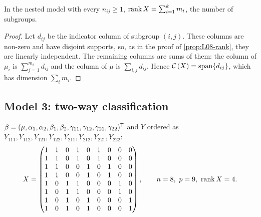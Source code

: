 \begin{proposition}\label{prop:L11-nestedrank}
In the nested model with every $n_{ij}\ge1$, $\operatorname{rank} X=\sum_{i=1}^k m_i$, the number of subgroups.
\end{proposition}
\begin{proof}
Let $d_{ij}$ be the indicator column of subgroup $(i,j)$. These columns are non-zero and have
disjoint supports, so, as in the proof of \cref{prop:L08-rank}, they are linearly independent.
The remaining columns are sums of them: the column of $\mu_i$ is $\sum_{j=1}^{m_i}d_{ij}$ and the
column of $\mu$ is $\sum_{i,j}d_{ij}$. Hence $\mathcal{C}\left(X\right)=\mathrm{span}\{d_{ij}\}$, which has dimension $\sum_i m_i$.
\end{proof}

\subsection{Model 3: two-way classification}
\begin{example}[$I=J=2$, $n_{ij}=2$]\label{ex:L11-twoway}
$\beta=(\mu,\alpha_1,\alpha_2,\beta_1,\beta_2,\gamma_{11},\gamma_{12},\gamma_{21},\gamma_{22})^{\mathsf T}$ and $Y$
ordered as $Y_{111},Y_{112},Y_{121},Y_{122},Y_{211},Y_{212},Y_{221},Y_{222}$:
\[
X=\begin{pmatrix}
1&1&0&1&0&1&0&0&0\\
1&1&0&1&0&1&0&0&0\\
1&1&0&0&1&0&1&0&0\\
1&1&0&0&1&0&1&0&0\\
1&0&1&1&0&0&0&1&0\\
1&0&1&1&0&0&0&1&0\\
1&0&1&0&1&0&0&0&1\\
1&0&1&0&1&0&0&0&1
\end{pmatrix},\qquad n=8,\ p=9,\ \operatorname{rank} X=4 .
\]
\end{example}

